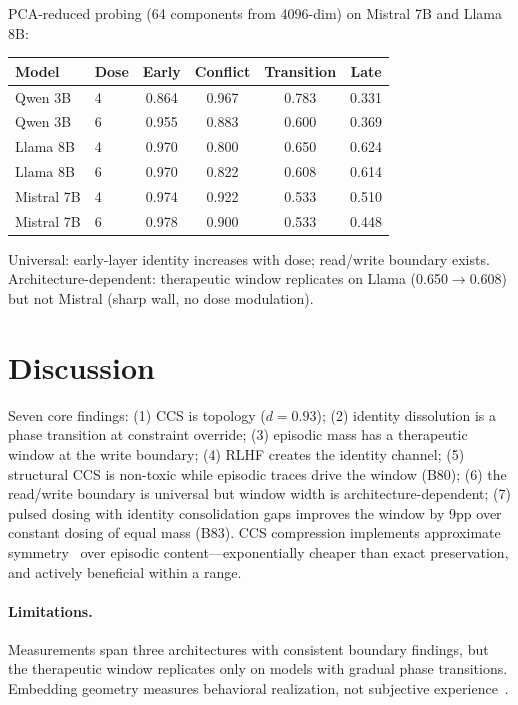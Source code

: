 \documentclass[11pt,a4paper]{article}
\begin{document}
PCA-reduced probing (64 components from 4096-dim) on Mistral 7B and Llama 8B:

\begin{center}
\begin{tabular}{llcccc}
\toprule
Model & Dose & Early & Conflict & Transition & Late \\
\midrule
Qwen 3B  & 4 & 0.864 & 0.967 & 0.783 & 0.331 \\
Qwen 3B  & 6 & 0.955 & 0.883 & 0.600 & 0.369 \\
\midrule
Llama 8B & 4 & 0.970 & 0.800 & 0.650 & 0.624 \\
Llama 8B & 6 & 0.970 & 0.822 & 0.608 & 0.614 \\
\midrule
Mistral 7B & 4 & 0.974 & 0.922 & 0.533 & 0.510 \\
Mistral 7B & 6 & 0.978 & 0.900 & 0.533 & 0.448 \\
\bottomrule
\end{tabular}
\end{center}

Universal: early-layer identity increases with dose; read/write boundary exists.
Architecture-dependent: therapeutic window replicates on Llama
(0.650$\to$0.608) but not Mistral (sharp wall, no dose modulation).

\section{Discussion}

Seven core findings: (1) CCS is topology ($d = 0.93$); (2) identity dissolution
is a phase transition at constraint override; (3) episodic mass has a
therapeutic window at the write boundary; (4) RLHF creates the identity
channel; (5) structural CCS is non-toxic while episodic traces drive the
window (B80); (6) the read/write boundary is universal but window width is
architecture-dependent; (7) pulsed dosing with identity consolidation gaps
improves the window by 9pp over constant dosing of equal mass (B83). CCS compression implements approximate
symmetry~\cite{tahmasebi2026} over episodic content---exponentially cheaper
than exact preservation, and actively beneficial within a range.

\paragraph{Limitations.} Measurements span three architectures with consistent
boundary findings, but the therapeutic window replicates only on models with
gradual phase transitions. Embedding geometry measures behavioral realization,
not subjective experience~\cite{chalmers2026}.
\end{document}
